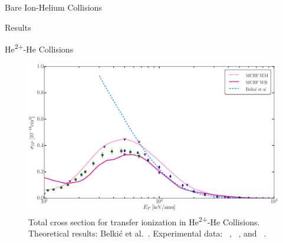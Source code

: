 \documentclass[a5paper, 9 pt]{extreport}
\begin{document}
\begin{chapter}{Bare Ion-Helium Collisions \label{chap:p-he2p-he}}
\begin{section}{Results \label{sec:phe2p-res}}
\begin{subsection}{\texorpdfstring{He\textsuperscript{2+}}{He2+}-He Collisions
                         \label{sec:he2phe-res}}
         \begin{figure}[t]
            \centering
            \includegraphics[width = 0.95 \linewidth]{./images/he2phe/he2phe-IP.eps}
            \caption[Total cross section for transfer ionization in He\textsuperscript{2+}-He
                     Collisions.]{Total cross section for transfer ionization in
                     He\textsuperscript{2+}-He Collisions. Theoretical results: Belki\'{c}
                     et al.~\cite{BMM-97}.
                     Experimental data: {\color{blue}{$\blacklozenge$}}~\cite{SG85},
                     {\color{OliveGreen}{$\bullet$}}~\cite{SG89}, and
                     {\color{RedViolet}{$\blacktriangledown$}}~\cite{Dubois87}. \label{fig:he2phe-ip}}
         \end{figure}


\end{subsection}
\end{section}
\end{chapter}
\end{document}
